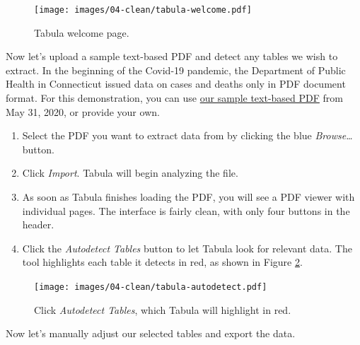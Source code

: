 \documentclass[
  english,
]{book}
\begin{document}
\begin{figure}
\centering
\texttt{[image: images/04-clean/tabula-welcome.pdf]}
\caption{\label{fig:tabula-welcome}Tabula welcome page.}
\end{figure}

Now let's upload a sample text-based PDF and detect any tables we wish to extract. In the beginning of the Covid-19 pandemic, the Department of Public Health in Connecticut
issued data on cases and deaths only in PDF document format.
For this demonstration, you can use \href{data/ct-dph-covid-2020-05-31.pdf}{our sample text-based PDF}
from May 31, 2020, or provide your own.

\begin{enumerate}
\def\labelenumi{\arabic{enumi}.}
\item
  Select the PDF you want to extract data from by clicking the blue \emph{Browse\ldots{}} button.
\item
  Click \emph{Import}. Tabula will begin analyzing the file.
\item
  As soon as Tabula finishes loading the PDF, you will see a PDF viewer with individual pages. The interface is fairly clean, with only four buttons in the header.
\item
  Click the \emph{Autodetect Tables} button to let Tabula look for relevant data. The tool highlights each table it detects in red, as shown in Figure \ref{fig:tabula-autodetect}.
\end{enumerate}



\begin{figure}
\centering
\texttt{[image: images/04-clean/tabula-autodetect.pdf]}
\caption{\label{fig:tabula-autodetect}Click \emph{Autodetect Tables}, which Tabula will highlight in red.}
\end{figure}

Now let's manually adjust our selected tables and export the data.
\end{document}
